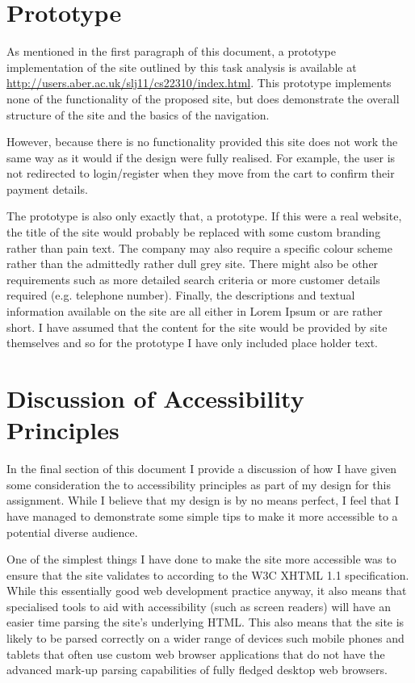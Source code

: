 \documentclass{article}
\begin{document}
\section{Prototype}
As mentioned in the first paragraph of this document, a prototype implementation of the site outlined by this task analysis is available at \url{http://users.aber.ac.uk/slj11/cs22310/index.html}. This prototype implements none of the functionality of the proposed site, but does demonstrate the overall structure of the site and the basics of the navigation. 

However, because there is no functionality provided this site does not work the same way as it would if the design were fully realised. For example, the user is not redirected to login/register when they move from the cart to confirm their payment details.

The prototype is also only exactly that, a prototype. If this were a real website, the title of the site would probably be replaced with some custom branding rather than pain text. The company may also require a specific colour scheme rather than the admittedly rather dull grey site. There might also be other requirements such as more detailed search criteria or more customer details required (e.g. telephone number). Finally, the descriptions and textual information available on the site are all either in Lorem Ipsum or are rather short. I have assumed that the content for the site would be provided by site themselves and so for the prototype I have only included place holder text.

\clearpage

\section{Discussion of Accessibility Principles}
In the final section of this document I provide a discussion of how I have given some consideration the to accessibility principles as part of my design for this assignment. While I believe that my design is by no means perfect, I feel that I have managed to demonstrate some simple tips to make it more accessible to a potential diverse audience.

One of the simplest things I have done to make the site more accessible was to ensure that the site validates to according to the W3C XHTML 1.1 specification. While this essentially good web development practice anyway, it also means that specialised tools to aid with accessibility (such as screen readers) will have an easier time parsing the site's underlying HTML. This also means that the site is likely to be parsed correctly on a wider range of devices such mobile phones and tablets that often use custom web browser applications that do not have the advanced mark-up parsing capabilities of fully fledged desktop web browsers.
\end{document}
